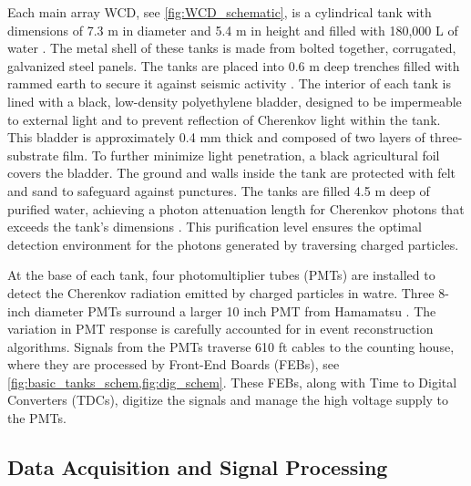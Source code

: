 Each main array WCD, see \cref{fig:WCD_schematic}, is a cylindrical tank with dimensions of 7.3 m in diameter and 5.4 m in height and filled with 180,000 L of water \cite{HAWC_NIM}.
The metal shell of these tanks is made from bolted together, corrugated, galvanized steel panels.
The tanks are placed into 0.6 m deep trenches filled with rammed earth to secure it against seismic activity \cite{HAWC_NIM}.
The interior of each tank is lined with a black, low-density polyethylene bladder, designed to be impermeable to external light and to prevent reflection of Cherenkov light within the tank.
This bladder is approximately 0.4 mm thick and composed of two layers of three-substrate film.
To further minimize light penetration, a black agricultural foil covers the bladder.
The ground and walls inside the tank are protected with felt and sand to safeguard against punctures.
The tanks are filled 4.5 m deep of purified water, achieving a photon attenuation length for Cherenkov photons that exceeds the tank's dimensions \cite{HAWC_NIM}.
This purification level ensures the optimal detection environment for the photons generated by traversing charged particles.

At the base of each tank, four photomultiplier tubes (PMTs) are installed to detect the Cherenkov radiation emitted by charged particles in watre.
Three 8-inch diameter PMTs surround a larger 10 inch PMT from Hamamatsu \cite{hawc_pmt}.
The variation in PMT response is carefully accounted for in event reconstruction algorithms.
Signals from the PMTs traverse 610 ft cables to the counting house, where they are processed by Front-End Boards (FEBs), see \cref{fig:basic_tanks_schem,fig:dig_schem}.
These FEBs, along with Time to Digital Converters (TDCs), digitize the signals and manage the high voltage supply to the PMTs.

\subsection{Data Acquisition and Signal Processing} \label{sec:hawc_daq}

